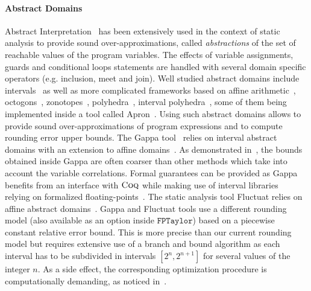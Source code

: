 \documentclass[preprint,fleqn,nocopyrightspace]{sigplanconf}
\newcommand{\coq}{\text{\sc Coq}}
\newcommand{\fptaylor}{\mathtt{FPTaylor}}
\theoremstyle{plain}
\begin{document}
\paragraph{Abstract Domains}
Abstract Interpretation~\cite{CousotCousot77} has been extensively used in the context of static analysis to provide sound over-approximations, called {\em abstractions} of the set of reachable values of the program variables. The effects of variable assignments, guards and conditional loops statements are handled with several domain specific operators (e.g. inclusion, meet and join). Well studied abstract domains include intervals~\cite{Moore62} as well as more complicated frameworks based on affine arithmetic~\cite{Stolfi03}, octogons~\cite{octogons}, zonotopes~\cite{Zonotope10}, polyhedra~\cite{polyhedra08}, interval polyhedra~\cite{IntervalPoly09}, some of them being implemented inside a tool called {\sc Apron}~\cite{Apron09}. Using such abstract domains allows to provide sound over-approximations of program expressions and to compute rounding error upper bounds. The {\sc Gappa} tool~\cite{Daumas10} relies on interval abstract domains with an extension to affine domains~\cite{Linderman10}. As demonstrated in~\cite{fptaylor15}, the bounds obtained inside {\sc Gappa} are often coarser than other methods which take into account the variable correlations. Formal guarantees can be provided as {\sc Gappa} benefits from an interface with $\coq$ while making use of interval libraries~\cite{Melquiond201214} relying on formalized floating-points~\cite{BM11Flocq}. The static analysis tool {\sc Fluctuat} relies on affine abstract domains~\cite{Blanchet03}. {\sc Gappa} and {\sc Fluctuat} tools use a different rounding model (also available as an option inside $\fptaylor$) based on a piecewise constant relative error bound. This is more precise than our current rounding model but requires extensive use of a branch and bound algorithm as each interval has to be subdivided in intervals $[2^n, 2^{n+1}]$ for several values of the integer $n$.  As a side effect, the corresponding optimization procedure is computationally demanding, as noticed in~\cite{fptaylor15}.
\end{document}

